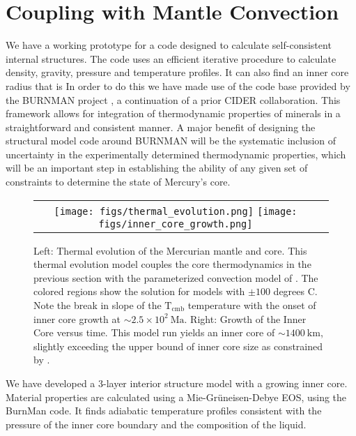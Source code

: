 \section{Coupling with Mantle Convection}

We have a working prototype for a code designed to calculate self-consistent
internal structures. The code uses an efficient iterative procedure to
calculate density, gravity, pressure and temperature profiles. It can also find
an inner core radius that is In order to do this we have made use of the
code base provided by the BURNMAN project \citep{Cottaar2014}, a continuation
of a prior CIDER collaboration. This framework allows for integration of
thermodynamic properties of minerals in a straightforward and consistent
manner. A major benefit of designing the structural model code around BURNMAN
will be the systematic inclusion of uncertainty in the experimentally
determined thermodynamic properties, which will be an important step in
establishing the ability of any given set of constraints to determine the state
of Mercury’s core. 

 \begin{figure}[h] %
   \centering
\begin{tabular}{cc}
 \texttt{[image: figs/thermal\_evolution.png]}
 \texttt{[image: figs/inner\_core\_growth.png]}
\end{tabular}
\caption{Left: Thermal evolution of the Mercurian mantle and core. This
  thermal evolution model couples the core thermodynamics in the previous section
  with the parameterized convection model of \citep{Stevenson1983}. The colored
  regions show the solution for models with $\pm \mathrm{100}$ degrees C. Note the
  break in slope of the $\mathrm{T_{cmb}}$ temperature with the onset of inner core
  growth at $\sim 2.5\times10^2~\mathrm{Ma}$. Right: Growth of the Inner Core versus
  time. This model run yields an inner core of $ \sim 1400~\mathrm{km}$, slightly
  exceeding the upper bound of inner core size as constrained by \citep{Dumberry2015}.}
  \label{fig:thermal}
\end{figure}

We have developed a 3-layer interior structure model with a growing inner core.
Material properties are calculated using a Mie-Gr\"{u}neisen-Debye EOS, using the BurnMan
code. It finds adiabatic temperature profiles consistent with the pressure of the 
inner core boundary and the composition of the liquid. 

